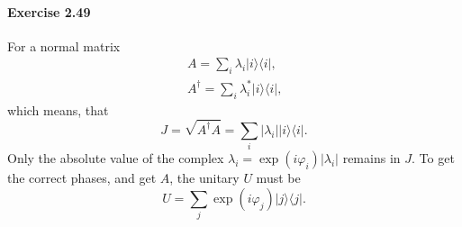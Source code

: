 \documentclass[a4paper,12pt]{article}
\newcommand{\exercise}[1]{\paragraph{Exercise #1}}
\newcommand{\la}{\langle}
\newcommand{\ra}{\rangle}
\begin{document}
    \exercise{2.49} For a normal matrix
    \begin{gather}
        \nonumber
        A  = \sum_i \lambda_i | i \ra \la i | \textrm{,} \\
        A^\dagger  = \sum_i \lambda_i^* | i \ra \la i | \textrm{,}
    \end{gather}
    which means, that
    \begin{equation}
        J  = \sqrt{A^\dagger A} = \sum_i |\lambda_i| | i \ra \la i | \textrm{.}
    \end{equation}
    Only the absolute value of the complex $\lambda_i = \exp(i \varphi_i) |\lambda_i|$ remains in $J$. To get the correct phases, and get $A$, the unitary $U$ must be
    \begin{equation}
        U = \sum_j \exp(i \varphi_j) | j \ra \la j | \textrm{.}
    \end{equation}
\end{document}
